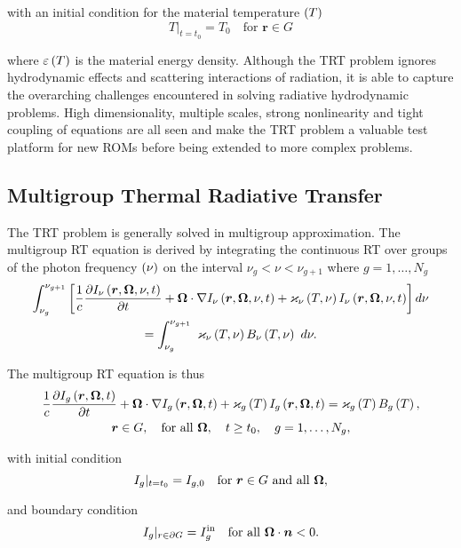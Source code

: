 	with an initial condition for the material temperature $\left( T\right)$
	\begin{equation}
		T|_{t=t_0} = T_{0} \quad \text{for } \bm{r} \in G
	\end{equation}
	
	where $\varepsilon\left( T\right)$ is the material energy density. Although the TRT problem ignores hydrodynamic effects and scattering interactions of radiation, it is able to capture the overarching challenges encountered in solving radiative hydrodynamic problems. High dimensionality, multiple scales, strong nonlinearity and tight coupling of equations are all seen and make the TRT problem a valuable test platform for new ROMs before being extended to more complex problems.
	
\subsection{Multigroup Thermal Radiative Transfer}
	The TRT problem is generally solved in multigroup approximation. The multigroup RT equation is derived by integrating the continuous RT  over groups of the photon frequency $\left(\nu\right)$ on the interval $\nu_{g} < \nu < \nu_{g+1}$ where $g=1,\dots,N_g$
	\begin{multline}
		\int_{\nu_{g}}^{\nu_{g+1}}\left[\frac{1}{c}\frac{\partial I_{\nu}\left(\bm{r},\bm{\Omega},\nu,t\right)}{\partial t} + \bm{\Omega}\cdot\nabla I_{\nu}\left(\bm{r},\bm{\Omega},\nu,t\right) + \varkappa_{\nu}\left( T,\nu\right)I_{\nu}\left(\bm{r},\bm{\Omega},\nu,t\right)\right]d\nu \\= \int_{\nu_{g}}^{\nu_{g+1}} \ \varkappa_{\nu}\left( T,\nu\right)B_{\nu}\left( T,\nu\right) \ d\nu.
	\end{multline}
	
	The multigroup RT equation is thus
	\begin{gather}
		\frac{1}{c}\frac{\partial I_{g}\left(\bm{r},\bm{\Omega},t\right)}{\partial t} + \bm{\Omega}\cdot\nabla I_{g}\left(\bm{r},\bm{\Omega},t\right) + \varkappa_{g}\left( T\right)I_{g}\left(\bm{r},\bm{\Omega},t\right) = \varkappa_{g}\left( T\right)B_{g}\left( T\right), \label{General_RTg_eqn}\\
		\bm{r} \in G, \quad \text{for all } \bm{\Omega}, \quad t\geq t_0, \quad g=1,\dots,N_g, \nonumber
	\end{gather}
	
	with initial condition
	\begin{equation}
		I_{g}|_{t=t_0} = I_{g,0} \quad \text{for } \bm{r} \in G \text{ and all } \bm{\Omega},
	\end{equation}
	
	and boundary condition
	\begin{equation}
		I_{g}|_{r\in\partial G} = I_{g}^{\text{in}} \quad \text{for all } \bm{\Omega}\cdot \bm{n} < 0.
	\end{equation}
	
